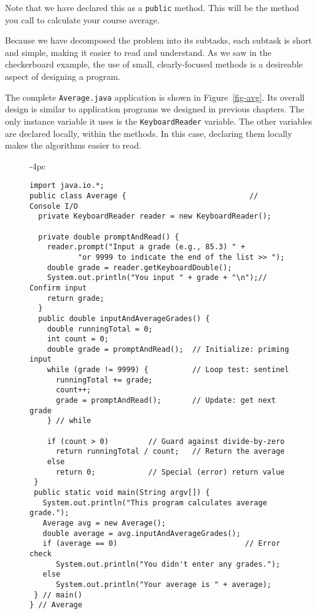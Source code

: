 \noindent Note that we have declared this as a {\tt public}
method. This will be the method you call to calculate your course
average. 

Because we have decomposed the problem into its subtasks, each subtask
is short and simple, making it easier to read and understand. As we saw
in the checkerboard example, the use of small, clearly-focused methods
is a desireable aspect of designing a program.

The complete {\tt Average.java} application is shown in
Figure~\ref{fig-avg}. Its overall design is similar to application
programs we designed in previous chapters. The only instance variable
it uses is the {\tt KeyboardReader} variable. The other variables are
declared locally, within the methods. In this case, declaring them
locally makes the algorithms easier to read.

\begin{figure}[h!]
\jjjprogstart
\begin{jjjlistingleft}[30pc]{-4pc}
\begin{lstlisting}
import java.io.*;
public class Average {                            // Console I/O
  private KeyboardReader reader = new KeyboardReader();  

  private double promptAndRead() {
    reader.prompt("Input a grade (e.g., 85.3) " +
           "or 9999 to indicate the end of the list >> ");
    double grade = reader.getKeyboardDouble();
    System.out.println("You input " + grade + "\n");// Confirm input
    return grade;
  }
  public double inputAndAverageGrades() {
    double runningTotal = 0;
    int count = 0;
    double grade = promptAndRead();  // Initialize: priming input
    while (grade != 9999) {          // Loop test: sentinel
      runningTotal += grade;                            
      count++;                                          
      grade = promptAndRead();       // Update: get next grade
    } // while

    if (count > 0)         // Guard against divide-by-zero
      return runningTotal / count;   // Return the average
    else
      return 0;            // Special (error) return value
 }
 public static void main(String argv[]) {
   System.out.println("This program calculates average grade."); 
   Average avg = new Average();
   double average = avg.inputAndAverageGrades();
   if (average == 0)                             // Error check
      System.out.println("You didn't enter any grades.");
   else
      System.out.println("Your average is " + average);        
 } // main()
} // Average
\end{lstlisting}
\end{jjjlistingleft}
\end{figure}


